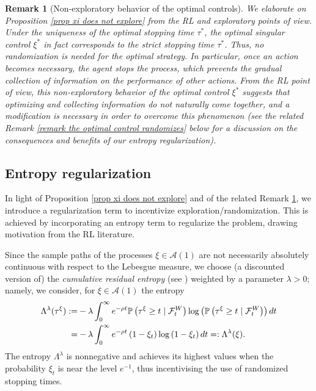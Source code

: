 \documentclass[11pt]{amsart}
\newtheorem{remark}[theorem]{Remark}
\theoremstyle{plain}
\def \dd{{\rm d}}
\def \cF{{\mathcal F}}
\def \A{\mathcal{A}}
\numberwithin{equation}{section}
\begin{document}
\begin{remark}[Non-exploratory behavior of the optimal controls]\label{remark xi does not explore}
We elaborate on Proposition \ref{prop xi does not explore} from the RL and exploratory points of view. 
Under the uniqueness of the optimal stopping time $\tau^*$, the optimal singular control $\xi^*$ in fact corresponds to the strict stopping time $\tau^*$. 
Thus, no randomization is needed for the optimal strategy. 
In particular, once an action becomes necessary, the agent stops the process, which prevents the gradual collection of information on the performance of other actions.
From the RL point of view, this non-exploratory behavior of the optimal control $\xi^*$ suggests that optimizing and collecting information do not naturally come together, and a modification is necessary in order to overcome this phenomenon (see the related Remark \ref{remark the optimal control randomizes} below for a discussion on the consequences and benefits of our entropy regularization). 
\end{remark}

\subsection{Entropy regularization}
In light of Proposition \ref{prop xi does not explore} and of the related Remark \ref{remark xi does not explore}, we introduce a regularization term to incentivize exploration/randomization.  This is achieved by incorporating an entropy term to regularize the problem, drawing motivation from the RL literature.

Since the sample paths of the processes $\xi \in \mathcal A (1)$ are not necessarily absolutely continuous with respect to the Lebesgue measure, we choose (a discounted version of) the \emph{cumulative residual entropy} (see \cite{rao.chen.vemuri.wang.2004cumulative}) weighted by a parameter $\lambda >0$; 
namely, we consider, for $\xi \in \A (1)$ the entropy
\begin{equation}\label{eq:CRE}
\begin{aligned}
\Lambda^\lambda (\tau^\xi) :=&-\lambda \int_{0}^{\infty} e^{- \rho t} \mathbb{P} \left( \tau^\xi \geq t \mid \cF _{t}^{W} \right) \log \left(\mathbb{P}\left(\tau^\xi \geq t \mid \mathcal{F}_{t}^{W}\right)\right)  \dd t \\
 =& -\lambda \int_{0}^{\infty} e^{- \rho t}\left(1-\xi_{t}\right) \log \left(1-\xi_{t}\right)  \dd t =: \Lambda^\lambda (\xi).
\end{aligned}
\end{equation}
The entropy $\Lambda^\lambda$ is nonnegative and achieves its highest values when the probability $\xi_t$ is near the level $e^{-1}$, thus incentivising the use of randomized stopping times.
\end{document}
